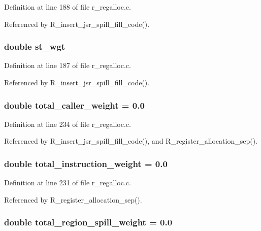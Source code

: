 Definition at line 188 of file r\_\-regalloc.c.

Referenced by R\_\-insert\_\-jsr\_\-spill\_\-fill\_\-code().
\subsubsection{\setlength{\rightskip}{0pt plus 5cm}double \bf{st\_\-wgt}}\label{r__regalloc_8c_ca0a0b44fc8d6a56b9f78ce8c60170ca}




Definition at line 187 of file r\_\-regalloc.c.

Referenced by R\_\-insert\_\-jsr\_\-spill\_\-fill\_\-code().
\subsubsection{\setlength{\rightskip}{0pt plus 5cm}double \bf{total\_\-caller\_\-weight} = 0.0}\label{r__regalloc_8c_79eb96ea76194350e245f552d858ae95}




Definition at line 234 of file r\_\-regalloc.c.

Referenced by R\_\-insert\_\-jsr\_\-spill\_\-fill\_\-code(), and R\_\-register\_\-allocation\_\-sep().
\subsubsection{\setlength{\rightskip}{0pt plus 5cm}double \bf{total\_\-instruction\_\-weight} = 0.0}\label{r__regalloc_8c_c643820fe073dfd44fb62a6430595b9c}




Definition at line 231 of file r\_\-regalloc.c.

Referenced by R\_\-register\_\-allocation\_\-sep().
\subsubsection{\setlength{\rightskip}{0pt plus 5cm}double \bf{total\_\-region\_\-spill\_\-weight} = 0.0}\label{r__regalloc_8c_438ba5d7669773a5742206bd31674ecb}




